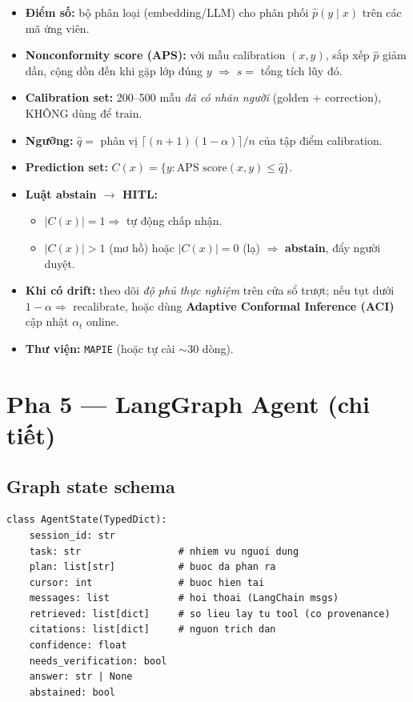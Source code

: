 \documentclass[11pt,a4paper]{article}
\begin{document}
\begin{itemize}
  \item \textbf{Điểm số:} bộ phân loại (embedding/LLM) cho phân phối $\hat p(y\mid x)$ trên các mã ứng viên.
  \item \textbf{Nonconformity score (APS):} với mẫu calibration $(x,y)$, sắp xếp $\hat p$ giảm dần, cộng dồn đến khi gặp lớp đúng $y$ $\Rightarrow$ $s = $ tổng tích lũy đó.
  \item \textbf{Calibration set:} 200--500 mẫu \emph{đã có nhãn người} (golden + correction), KHÔNG dùng để train.
  \item \textbf{Ngưỡng:} $\hat q = $ phân vị $\lceil (n{+}1)(1-\alpha)\rceil / n$ của tập điểm calibration.
  \item \textbf{Prediction set:} $C(x) = \{y : \text{APS score}(x,y) \le \hat q\}$.
  \item \textbf{Luật abstain $\rightarrow$ HITL:}
  \begin{itemize}
    \item $|C(x)| = 1 \Rightarrow$ tự động chấp nhận.
    \item $|C(x)| > 1$ (mơ hồ) hoặc $|C(x)| = 0$ (lạ) $\Rightarrow$ \textbf{abstain}, đẩy người duyệt.
  \end{itemize}
  \item \textbf{Khi có drift:} theo dõi \emph{độ phủ thực nghiệm} trên cửa sổ trượt; nếu tụt dưới $1-\alpha \Rightarrow$ recalibrate, hoặc dùng \textbf{Adaptive Conformal Inference (ACI)} cập nhật $\alpha_t$ online.
  \item \textbf{Thư viện:} \texttt{MAPIE} (hoặc tự cài $\sim$30 dòng).
\end{itemize}

\section{Pha 5 --- LangGraph Agent (chi tiết)}

\subsection{Graph state schema}
\begin{Verbatim}
class AgentState(TypedDict):
    session_id: str
    task: str                 # nhiem vu nguoi dung
    plan: list[str]           # buoc da phan ra
    cursor: int               # buoc hien tai
    messages: list            # hoi thoai (LangChain msgs)
    retrieved: list[dict]     # so lieu lay tu tool (co provenance)
    citations: list[dict]     # nguon trich dan
    confidence: float
    needs_verification: bool
    answer: str | None
    abstained: bool
\end{Verbatim}
\end{document}
